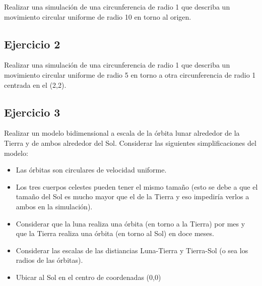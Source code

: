 \documentclass[a4paper]{article}
\begin{document}
Realizar una simulación de una circunferencia de radio 1 que describa un 
movimiento circular uniforme de radio 10 en torno al origen.

\subsection{Ejercicio 2}

Realizar una simulación de una circunferencia de radio 1 que describa un 
movimiento circular uniforme de radio 5 en torno a otra circunferencia 
de radio 1 centrada en el (2,2).


\subsection{Ejercicio 3}

Realizar un modelo bidimensional a escala de la órbita lunar alrededor 
de la Tierra y de ambos alrededor del Sol. Considerar las siguientes 
simplificaciones del modelo:

\begin{itemize}
	\item Las órbitas son circulares de velocidad uniforme.
	\item Los tres cuerpos celestes pueden tener el mismo tamaño (esto 
	se debe a que el tamaño del Sol es mucho mayor que el de la 
	Tierra y eso impediría verlos a ambos en la simulación).
	\item Considerar que la luna realiza una órbita (en torno a la 
	Tierra) por mes y que la Tierra realiza una órbita (en torno al Sol) 
	en doce meses. 
	\item Considerar las escalas de las distiancias Luna-Tierra y 
	Tierra-Sol (o sea los radios de las órbitas).
	\item Ubicar al Sol en el centro de coordenadas (0,0)
\end{itemize}
\end{document}
